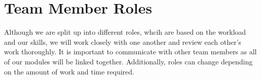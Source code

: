 \documentclass{article}
\begin{document}
\section{Team Member Roles}
Although we are split up into different roles, whcih are based on the workload and our skills, we will work closely with one another and review each other's work thoroughly. It is important to communicate with other team members as all of our modules will be linked together. Additionally, roles can change depending on the amount of work and time required. 
\begin{comment}
\begin{table}[]
	\centering
	\begin{tabular}{| m{5em} | m{4cm}| m{5cm} |}
	\hline
	Member						 & Role                                           & Description                                                                                                                                                                                                                \\ \hline
	Abraham Taha                 & Application Developer                          & This position is focused on creating a web application for the end user. This will allow the end user to interface with the hardware and change the sounds to detect.  \\ \hline
	Jordan Bierbrier             & Signal Processing / Embedded Systems Developer &                                                                                                                                                                                                      \\ \hline
	Taranjit Lotey               & Application Developer                          & Communication between application and hardware / backend development to send physical signals to user                                                                                                                      \\ \hline
	Azriel Gingoyon              & Hardware Developer                             & Cost-effective component research, wristband design, motor/microcontroller integration                                                                                                                                     \\ \hline
	Udeep Shah                   & Signal Processing / Embedded Systems Developer & Noise filtering, signal isolation resource optimization and power optimization                                                                                                                      \\ \hline
	\end{tabular}
\end{table}
\end{comment}
\end{document}
